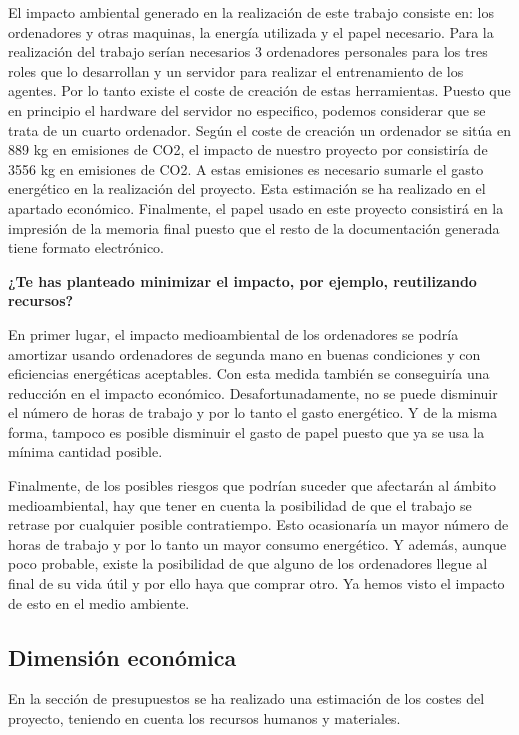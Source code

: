 El impacto ambiental generado en la realización de este trabajo consiste en: los ordenadores y otras maquinas, la energía utilizada y el papel necesario. Para la realización del trabajo serían necesarios 3 ordenadores personales para los tres roles que lo desarrollan y un servidor para realizar el entrenamiento de los agentes. Por lo tanto existe el coste de creación de estas herramientas. Puesto que en principio el hardware del servidor no especifico, podemos considerar que se trata de un cuarto ordenador. Según \cite{coste_ordenador} el coste de creación un ordenador se sitúa en 889 kg en emisiones de CO2, el impacto de nuestro proyecto por consistiría de 3556 kg en emisiones de CO2. A estas emisiones es necesario sumarle el gasto energético en la realización del proyecto. Esta estimación se ha realizado en el apartado económico. Finalmente, el papel usado en este proyecto consistirá en la impresión de la memoria final puesto que el resto de la documentación generada tiene formato electrónico.  

\textbf{¿Te has planteado minimizar el impacto, por ejemplo, reutilizando recursos?}

En primer lugar, el impacto medioambiental de los ordenadores se podría amortizar usando ordenadores de segunda mano en buenas condiciones y con eficiencias energéticas aceptables. Con esta medida también se conseguiría una reducción en el impacto económico. Desafortunadamente, no se puede disminuir el número de horas de trabajo y por lo tanto el gasto energético. Y de la misma forma, tampoco es posible disminuir el gasto de papel puesto que ya se usa la mínima cantidad posible. 

Finalmente, de los posibles riesgos que podrían suceder que afectarán al ámbito medioambiental, hay que tener en cuenta la posibilidad de que el trabajo se retrase por cualquier posible contratiempo. Esto ocasionaría un mayor número de horas de trabajo y por lo tanto un mayor consumo energético. Y además, aunque poco probable, existe la posibilidad de que alguno de los ordenadores llegue al final de su vida útil y por ello haya que comprar otro. Ya hemos visto el impacto de esto en el medio ambiente.

\subsection{Dimensión económica}

En la sección de presupuestos se ha realizado una estimación de los costes del proyecto, teniendo en cuenta los recursos humanos y materiales.

